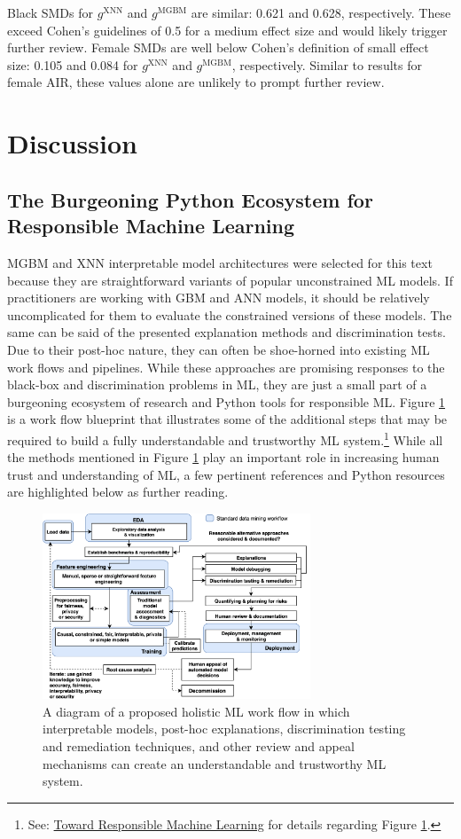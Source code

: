 \documentclass[information,article,submit,moreauthors,pdftex]{definitions/mdpi}
\begin{document}
Black SMDs for $g^{\text{XNN}}$ and $g^{\text{MGBM}}$ are similar: 0.621 and 0.628, respectively.  These exceed Cohen’s guidelines of 0.5 for a medium effect size and would likely trigger further review.  Female SMDs are well below Cohen’s definition of small effect size: 0.105 and 0.084 for $g^{\text{XNN}}$ and $g^{\text{MGBM}}$, respectively.  Similar to results for female AIR, these values alone are unlikely to prompt further review.

\section{Discussion}\label{sec:disc}

\subsection{The Burgeoning Python Ecosystem for Responsible Machine Learning}

MGBM and XNN interpretable model architectures were selected for this text because they are straightforward variants of popular unconstrained ML models. If practitioners are working with GBM and ANN models, it should be relatively uncomplicated for them to evaluate the constrained versions of these models. The same can be said of the presented explanation methods and discrimination tests. Due to their post-hoc nature, they can often be shoe-horned into existing ML work flows and pipelines. While these approaches are promising responses to the black-box and discrimination problems in ML, they are just a small part of a burgeoning ecosystem of research and Python tools for responsible ML. Figure \ref{fig:blueprint} is a work flow blueprint that illustrates some of the additional steps that may be required to build a fully understandable and trustworthy ML system.\footnote{See: \href{https://github.com/jphall663/hc_ml}{Toward Responsible Machine Learning} for details regarding Figure \ref{fig:blueprint}.} While all the methods mentioned in Figure \ref{fig:blueprint} play an important role in increasing human trust and understanding of ML, a few pertinent references and Python resources are highlighted below as further reading. 

\begin{figure}[H]
\centering
\includegraphics[width=8cm]{img/blueprint.png}
\caption{A diagram of a proposed holistic ML work flow in which interpretable models, post-hoc explanations, discrimination testing and remediation techniques, and other review and appeal mechanisms can create an understandable and trustworthy ML system.}
\label{fig:blueprint}
\end{figure}   
\end{document}
